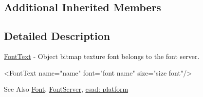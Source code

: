 \subsection*{Additional Inherited Members}


\subsection{Detailed Description}
\hyperlink{classcsad_1_1_font_text}{Font\-Text} -\/ Object bitmap texture font belongs to the font server. 

\begin{DoxyVerb}  <FontText name="name" font="font name" size="size font"/>
\end{DoxyVerb}
 \begin{DoxySeeAlso}{See Also}
\hyperlink{classcsad_1_1_font}{Font}, \hyperlink{classcsad_1_1_font_server}{Font\-Server}, \hyperlink{group__platform}{csad\-: platform} 
\end{DoxySeeAlso}

